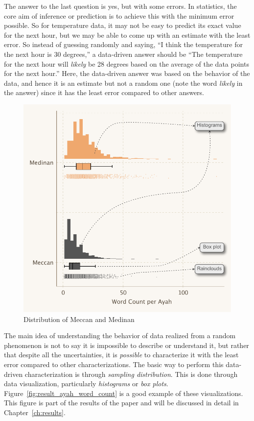 The answer to the last question is yes, but with some errors. In statistics, the core aim of inference or prediction is to achieve this with the minimum error possible. So for temperature data, it may not be easy to predict its exact value for the next hour, but we may be able to come up with an estimate with the least error. So instead of guessing randomly and saying, ``I think the temperature for the next hour is 30 degrees,'' a data-driven answer should be ``The temperature for the next hour will \textit{likely} be 28 degrees based on the average of the data points for the next hour.'' Here, the data-driven answer was based on the behavior of the data, and hence it is an estimate but not a random one (note the word \textit{likely} in the answer) since it has the least error compared to other answers.

\begin{figure}[!t]
    \centering
    \includegraphics[width=\textwidth]{img/plot3.pdf}
    \caption{Distribution of Meccan and Medinan  }
    \label{fig:result_ayah_word_count_aggregated}
\end{figure}

The main idea of understanding the behavior of data realized from a random phenomenon is not to say it is impossible to describe or understand it, but rather that despite all the uncertainties, it is \textit{possible} to characterize it with the least error compared to other characterizations. The basic way to perform this data-driven characterization is through \textit{sampling distribution}. This is done through data visualization, particularly \textit{histograms} or \textit{box plots}. Figure~\ref{fig:result_ayah_word_count} is a good example of these visualizations. This figure is part of the results of the paper and will be discussed in detail in Chapter~\ref{ch:results}.

